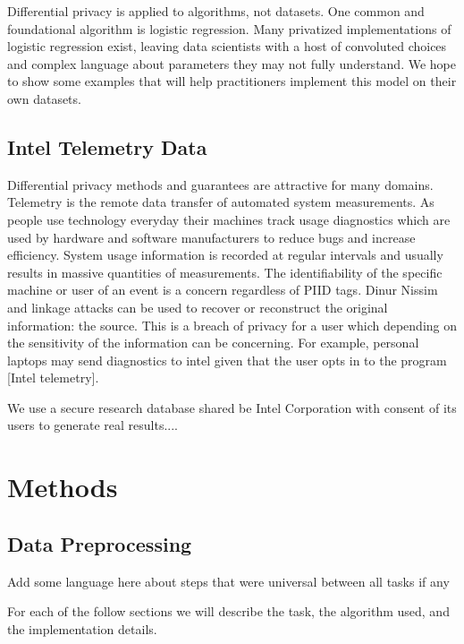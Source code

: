 \documentclass[12pt,letterpaper]{article}
\begin{document}
Differential privacy is applied to algorithms, not datasets. One common and foundational algorithm is logistic regression. Many privatized implementations of logistic regression exist, leaving data scientists with a host of convoluted choices and complex language about parameters they may not fully understand. We hope to show some examples that will help practitioners implement this model on their own datasets.

\subsection{Intel Telemetry Data}

Differential privacy methods and guarantees are attractive for many domains. Telemetry is the remote data transfer of automated system measurements. As people use technology everyday their machines track usage diagnostics which are used by hardware and software manufacturers to reduce bugs and increase efficiency. System usage information is recorded at regular intervals and usually results in massive quantities of measurements. The identifiability of the specific machine or user of an event is a concern regardless of PIID tags. Dinur Nissim \cite{dinur} and linkage attacks can be used to recover or reconstruct the original information: the source. This is a breach of privacy for a user which depending on the sensitivity of the information can be concerning. For example, personal laptops may send diagnostics to intel given that the user opts in to the program [Intel telemetry]. 

We use a secure research database shared be Intel Corporation with consent of its users to generate real results....



\section{Methods}

\subsection{Data Preprocessing}

Add some language here about steps that were universal between all tasks if any

For each of the follow sections we will describe the task, the algorithm used, and the implementation details.
\end{document}
